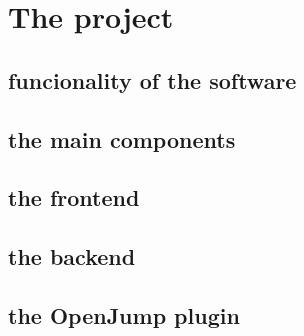 \section{The project}

\subsection{funcionality of the software}

\subsection{the main components}

\subsection{the frontend}

\subsection{the backend}

\subsection{the OpenJump plugin}
